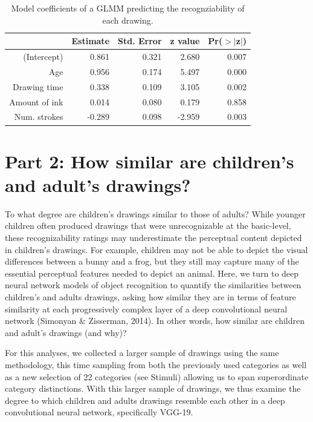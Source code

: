 \documentclass[10pt, letterpaper]{article}
\begin{document}
\begin{table}[H]
\centering
\begin{tabular}{rrrrr}
  \hline
 & Estimate & Std. Error & z value & Pr($>$$|$z$|$) \\ 
  \hline
(Intercept) & 0.861 & 0.321 & 2.680 & 0.007 \\ 
  Age & 0.956 & 0.174 & 5.497 & 0.000 \\ 
  Drawing time & 0.338 & 0.109 & 3.105 & 0.002 \\ 
  Amount of ink & 0.014 & 0.080 & 0.179 & 0.858 \\ 
  Num. strokes & -0.289 & 0.098 & -2.959 & 0.003 \\ 
   \hline
\end{tabular}
\caption{Model coefficients of a GLMM predicting the recognziability of each  drawing.} 
\end{table}

\section{Part 2: How similar are children's and adult's
drawings?}\label{part-2-how-similar-are-childrens-and-adults-drawings}

To what degree are children's drawings similar to those of adults? While
younger children often produced drawings that were unrecognizable at the
basic-level, these recognizability ratings may underestimate the
perceptual content depicted in children's drawings. For example,
children may not be able to depict the visual differences between a
bunny and a frog, but they still may capture many of the essential
perceptual features needed to depict an animal. Here, we turn to deep
neural network models of object recognition to quantify the similarities
between children's and adults drawings, asking how similar they are in
terms of feature similarity at each progressively complex layer of a
deep convolutional neural network (Simonyan \& Zisserman, 2014). In
other words, how similar are children and adult's drawings (and why)?

For this analyses, we collected a larger sample of drawings using the
same methodology, this time sampling from both the previously used
categories as well as a new selection of 22 categories (see Stimuli)
allowing us to span superordinate category distinctions. With this
larger sample of drawings, we thus examine the degree to which children
and adults drawings resemble each other in a deep convolutional neural
network, specifically VGG-19.
\end{document}
